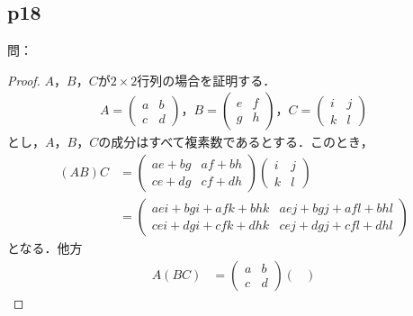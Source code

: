 \documentclass[dvipdfmx,uplatex,11pt]{jsarticle}
\theoremstyle{definition}
\begin{document}
\subsection{p18}
%
問： 
\begin{leftbar}
    \begin{proof}
        $A$，$B$，$C$が$2 \times 2$行列の場合を証明する．
        \begin{gather*}
            A=
            \begin{pmatrix}
                a & b \\
                c & d
            \end{pmatrix}
            ，
            B=
            \begin{pmatrix}
                e & f \\
                g & h
            \end{pmatrix}
            ，C=
            \begin{pmatrix}
                i & j \\
                k & l
            \end{pmatrix}
        \end{gather*}
        とし，$A$，$B$，$C$の成分はすべて複素数であるとする．このとき，
        \begin{align*}
            (AB)C & =
            \begin{pmatrix}
                ae+bg & af+bh \\
                ce+dg & cf+dh
            \end{pmatrix}
            \begin{pmatrix}
                i & j \\
                k & l
            \end{pmatrix}
            \\
            & =
            \begin{pmatrix}
                aei +bgi +afk +bhk & aej+bgj+afl+bhl \\
                cei +dgi+cfk +dhk & cej +dgj + cfl +dhl
            \end{pmatrix}
        \end{align*}
            となる．他方
            \begin{align*}
                A(BC)& =
                \begin{pmatrix}
                    a & b \\
                    c & d
                \end{pmatrix}
                \begin{pmatrix}

\end{pmatrix}
\end{align*}
\end{proof}
\end{leftbar}
\end{document}
